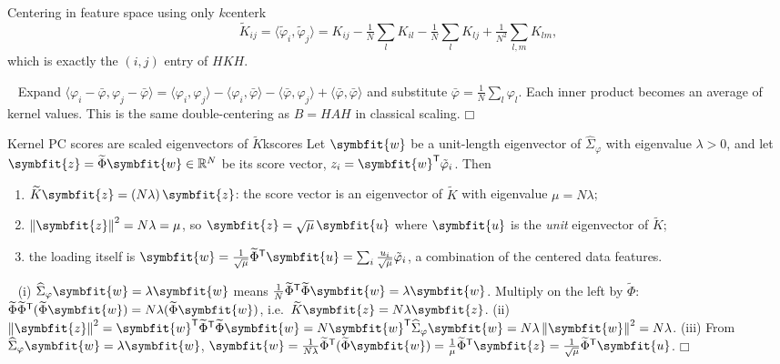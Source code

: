 \documentclass[11pt]{article}
\newcommand{\bm}[1]{\symbfit{#1}}
\newenvironment{proofsketch}{\par\noindent{\itshape Proof.}\ }{\hfill$\mdlgwhtsquare$\par}
\newcommand{\R}{\mathbb{R}}
\newcommand{\vw}{\bm{w}}
\newcommand{\vu}{\bm{u}}
\newcommand{\Sig}{\widehat{\Sigma}}
\newcommand{\T}{^{\mathsf T}}
\newcommand{\norm}[1]{\left\lVert #1\right\rVert}
\begin{document}
\begin{proposition}{Centering in feature space using only $k$}{centerk}
\[
\widetilde K_{ij}=\langle\tilde\varphi_i,\tilde\varphi_j\rangle
=K_{ij}-\tfrac1N\textstyle\sum_{l}K_{il}-\tfrac1N\sum_{l}K_{lj}+\tfrac1{N^2}\sum_{l,m}K_{lm},
\]
which is exactly the $(i,j)$ entry of $HKH$.
\end{proposition}
\begin{proofsketch}
Expand $\langle\varphi_i-\bar{\varphi},\varphi_j-\bar{\varphi}\rangle
=\langle\varphi_i,\varphi_j\rangle-\langle\varphi_i,\bar{\varphi}\rangle-\langle\bar{\varphi},\varphi_j\rangle+\langle\bar{\varphi},\bar{\varphi}\rangle$
and substitute $\bar{\varphi}=\tfrac1N\sum_l\varphi_l$. Each inner product becomes an average of
kernel values. This is the same double-centering as $B=HAH$ in classical scaling.
\end{proofsketch}

\begin{theorem}{Kernel PC scores are scaled eigenvectors of $\widetilde K$}{kscores}
Let $\vw$ be a unit-length eigenvector of $\Sig_\varphi$ with eigenvalue $\lambda>0$, and let
$\bm z=\widetilde\Phi\vw\in\R^N$ be its score vector, $z_i=\vw\T\tilde\varphi_i$. Then
\begin{enumerate}[nosep,label=(\roman*)]
\item $\widetilde K\bm z=(N\lambda)\,\bm z$: the score vector is an eigenvector of $\widetilde K$ with eigenvalue $\mu=N\lambda$;
\item $\norm{\bm z}^2=N\lambda=\mu$, so $\bm z=\sqrt{\mu}\,\vu$ where $\vu$ is the \emph{unit} eigenvector of $\widetilde K$;
\item the loading itself is $\vw=\tfrac1{\sqrt\mu}\widetilde\Phi\T\vu=\sum_i\tfrac{u_i}{\sqrt\mu}\tilde\varphi_i$, a combination of the centered data features.
\end{enumerate}
\end{theorem}
\begin{proofsketch}
(i) $\Sig_\varphi\vw=\lambda\vw$ means $\tfrac1N\widetilde\Phi\T\widetilde\Phi\vw=\lambda\vw$. Multiply on the left by $\widetilde\Phi$:
$\widetilde\Phi\widetilde\Phi\T(\widetilde\Phi\vw)=N\lambda(\widetilde\Phi\vw)$, i.e.\ $\widetilde K\bm z=N\lambda\bm z$.
(ii) $\norm{\bm z}^2=\vw\T\widetilde\Phi\T\widetilde\Phi\vw=N\vw\T\Sig_\varphi\vw=N\lambda\norm{\vw}^2=N\lambda$.
(iii) From $\Sig_\varphi\vw=\lambda\vw$, $\vw=\tfrac1{N\lambda}\widetilde\Phi\T(\widetilde\Phi\vw)=\tfrac1{\mu}\widetilde\Phi\T\bm z=\tfrac1{\sqrt\mu}\widetilde\Phi\T\vu$.
\end{proofsketch}
\end{document}
